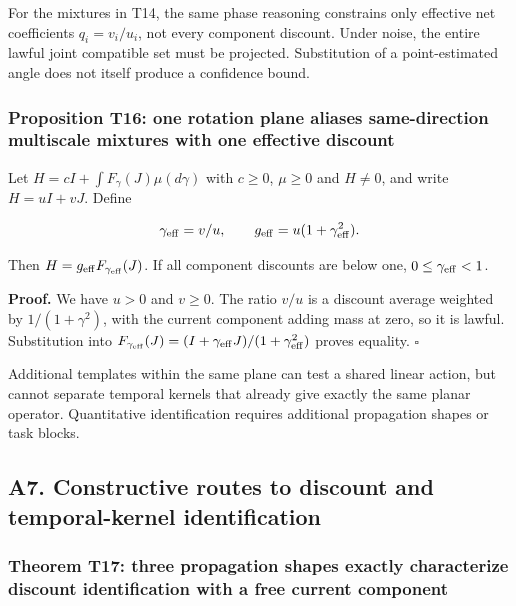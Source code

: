 \documentclass[11pt,a4paper]{article}
\begin{document}
For the mixtures in T14, the same phase reasoning constrains only
effective net coefficients \(q_i=v_i/u_i\), not every component
discount. Under noise, the entire lawful joint compatible set must be
projected. Substitution of a point-estimated angle does not itself
produce a confidence bound.

\subsubsection{Proposition T16: one rotation plane aliases
same-direction multiscale mixtures with one effective
discount}\label{proposition-t16-one-rotation-plane-aliases-same-direction-multiscale-mixtures-with-one-effective-discount}

\par
\noindent\begin{minipage}{\linewidth}

Let \(H=cI+\int F_\gamma(J)\mu(d\gamma)\) with \(c\ge0\), \(\mu\ge0\)
and \(H\ne0\), and write \(H=uI+vJ\). Define

\[
\gamma_{\rm eff}=v/u,\qquad
g_{\rm eff}=u(1+\gamma_{\rm eff}^2).
\]

\end{minipage}\par

Then \(H=g_{\rm eff}F_{\gamma_{\rm eff}}(J)\). If all component
discounts are below one, \(0\le\gamma_{\rm eff}<1\).

\textbf{Proof.} We have \(u>0\) and \(v\ge0\). The ratio \(v/u\) is a
discount average weighted by \(1/(1+\gamma^2)\), with the current
component adding mass at zero, so it is lawful. Substitution into
\(F_{\gamma_{\rm eff}}(J)=(I+\gamma_{\rm eff}J)/(1+\gamma_{\rm eff}^2)\)
proves equality. \(\square\)

Additional templates within the same plane can test a shared linear
action, but cannot separate temporal kernels that already give exactly
the same planar operator. Quantitative identification requires
additional propagation shapes or task blocks.

\subsection{A7. Constructive routes to discount and temporal-kernel
identification}\label{a7.-constructive-routes-to-discount-and-temporal-kernel-identification}

\subsubsection{Theorem T17: three propagation shapes exactly
characterize discount identification with a free current
component}\label{theorem-t17-three-propagation-shapes-exactly-characterize-discount-identification-with-a-free-current-component}
\end{document}
